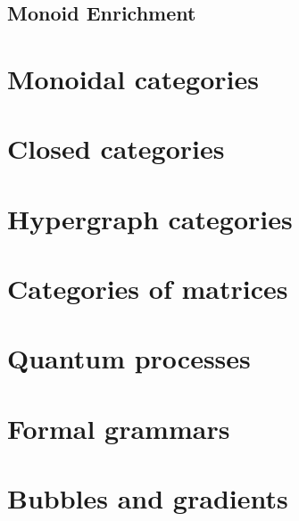 \section{Monoid Enrichment}

\chapter{Monoidal categories}
\chapter{Closed categories}
\chapter{Hypergraph categories}
\chapter{Categories of matrices}
\chapter{Quantum processes}
\chapter{Formal grammars}
\chapter{Bubbles and gradients}

\nocite{*}

\setlength{\baselineskip}{0pt} %

{\renewcommand*\MakeUppercase[1]{#1}%
\printbibliography[heading=bibintoc,title={\bibtitle}]}


